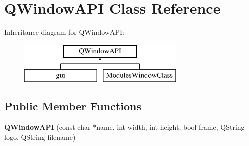 \hypertarget{class_q_window_a_p_i}{
\section{QWindowAPI Class Reference}
\label{class_q_window_a_p_i}
}
Inheritance diagram for QWindowAPI:\begin{figure}[H]
\begin{center}
\leavevmode
\includegraphics[height=2.000000cm]{class_q_window_a_p_i}
\end{center}
\end{figure}
\subsection*{Public Member Functions}
\begin{DoxyCompactItemize}
\item 
\hypertarget{class_q_window_a_p_i_ae8211c69c07c3831218c6098ecc6aaf5}{
{\bfseries QWindowAPI} (const char $\ast$name, int width, int height, bool frame, QString logo, QString filename)}
\label{class_q_window_a_p_i_ae8211c69c07c3831218c6098ecc6aaf5}

\end{DoxyCompactItemize}
